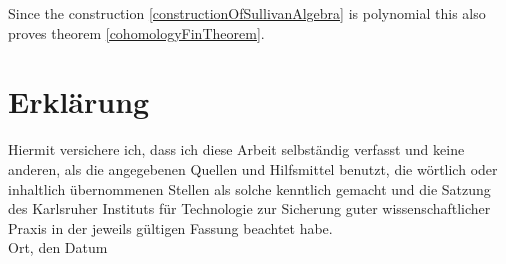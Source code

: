 \documentclass[12pt,a4paper]{scrartcl}
\numberwithin{equation}{section}
\begin{document}
 Since the construction \ref{constructionOfSullivanAlgebra} is polynomial this also proves theorem \ref{cohomologyFinTheorem}.
  \newpage
  
{}

 
      

\newpage
  
 \thispagestyle{empty}


\vspace*{8cm}


\section*{Erklärung}

Hiermit versichere ich, dass ich diese Arbeit selbständig verfasst und keine anderen, als die angegebenen Quellen und Hilfsmittel benutzt, die wörtlich oder inhaltlich übernommenen Stellen als solche kenntlich gemacht und die Satzung des Karlsruher Instituts für Technologie zur Sicherung guter wissenschaftlicher Praxis in der jeweils gültigen Fassung beachtet habe. \\[2ex] 

\noindent
Ort, den Datum\\[5ex]

\end{document}
